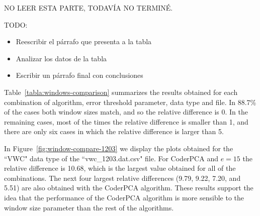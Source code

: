 \clearpage


\clearpage


NO LEER ESTA PARTE, TODAVÍA NO TERMINÉ.

TODO:
\vspace{-10pt}
\begin{itemize}
    \item Reescribir el párrafo que presenta a la tabla
    \item Analizar los datos de la tabla
    \item Escribir un párrafo final con conclusiones
\end{itemize}

Table~\ref{tabla:windows-comparison} summarizes the results obtained for each combination of algorithm, error threshold parameter, data type and file. In 88.7\% of the cases both window sizes match, and so the relative difference is 0. In the remaining cases, most of the times the relative difference is smaller than 1, and there are only six cases in which the relative difference is larger than 5.


\vspace{+5pt}

\vspace{-5pt}


In Figure~\ref{fig:window-compare-1203} we display the plots obtained for the ``VWC" data type of the ``vwc\_1203.dat.csv" file. For CoderPCA and $e=15$ the relative difference is 10.68, which is the largest value obtained for all of the combinations. The next four largest relative differences (9.79, 9.22, 7.20, and 5.51) are also obtained with the CoderPCA algorithm. These results support the idea that the performance of the CoderPCA algorithm is more sensible to the window size parameter than the rest of the algorithms.